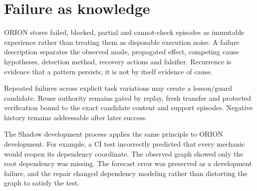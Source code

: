 \section{Failure as knowledge}
ORION stores failed, blocked, partial and cannot-check episodes as immutable experience rather than treating them as disposable execution noise.  A failure description separates the observed mode, propagated effect, competing cause hypotheses, detection method, recovery actions and falsifier.  Recurrence is evidence that a pattern persists; it is not by itself evidence of cause.

Repeated failures across explicit task variations may create a lesson/guard candidate.  Reuse authority remains gated by replay, fresh transfer and protected verification bound to the exact candidate content and support episodes.  Negative history remains addressable after later success.

The Shadow development process applies the same principle to ORION development.  For example, a CI test incorrectly predicted that every mechanic would reopen its dependency coordinate.  The observed graph showed only the root dependency was missing.  The forecast error was preserved as a development failure, and the repair changed dependency modeling rather than distorting the graph to satisfy the test.

